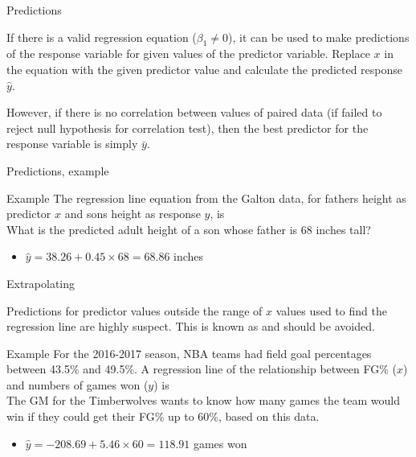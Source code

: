 \documentclass[xcolor=table, aspectratio=169, bigger, handout]{beamer}
\begin{document}
\begin{frame}{Predictions}
\begin{block}{}
If there is a valid regression equation ($\beta_1 \ne 0$), it can be used to make predictions of the response variable for given values of the predictor variable. Replace $x$ in the equation with the given predictor value and calculate the predicted response $\hat y$.
\end{block}

\pause
\begin{block}{}
However, if there is no correlation between values of paired data (if failed to reject null hypothesis for correlation test), then the best predictor for the response variable is simply $\bar y$.
\end{block}

\end{frame}

\begin{frame}{Predictions, example}
\begin{exampleblock}{Example}
The regression line equation from the Galton data, for fathers height as predictor $x$ and sons height as response $y$, is \\
\smallskip
{}
\medskip
What is the predicted adult height of a son whose father is 68 inches tall?
\begin{itemize}
\pause\item $\hat y = 38.26 + 0.45 \times 68 = 68.86$ inches
\end{itemize}
\end{exampleblock}
\end{frame}

\begin{frame}{Extrapolating}
\begin{block}{}
Predictions for predictor values outside the range of $x$ values used to find the regression line are highly suspect. This is known as  and should be avoided.
\end{block}

\pause
\begin{exampleblock}{Example}
For the 2016-2017 season, NBA teams had field goal percentages between 43.5\% and 49.5\%. A regression line of the relationship between FG\% ($x$) and numbers of games won ($y$) is  \\
\medskip
The GM for the Timberwolves wants to know how many games the team would win if they could get their FG\% up to 60\%, based on this data.
\begin{itemize}
\pause\item $\hat y = -208.69 + 5.46 \times 60 = 118.91$ games won
\end{itemize}

\end{exampleblock}

\end{frame}
\end{document}

